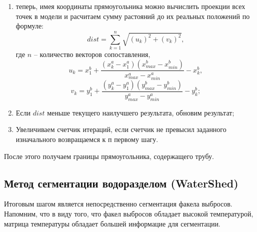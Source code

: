\documentclass[14pt, a4paper]{extreport}
\begin{document}
\begin{enumerate}[label={\arabic*)}]
\begin{subequations}
			\begin{equation*}
				y^{b}_{1} = y^{b}_{min} - \frac{(y^{a}_{min} - y^{a}_{1})(y^{b}_{max} - y^{b}_{min})}{y^{a}_{max} - y^{a}_{min}},
			\end{equation*}
			\vspace*{-1.1cm}
			\begin{equation*}
				y^{b}_{2} = y^{b}_{max} + \frac{(y^{a}_{2} - y^{a}_{max})(y^{b}_{max} - y^{b}_{min})}{y^{a}_{max} - y^{a}_{min}};
			\end{equation*}
			\label{x,y,1,2}
			\vspace*{-0.8cm}
		\end{subequations}
		\item теперь, имея координаты прямоугольника можно вычислить проекции всех точек в модели и расчитаем сумму растояний до их реальных положений по формуле:
		\begin{equation}
			dist = \sum\limits_{k=1}^n \sqrt{(u_k)^2 + (v_k)^2},
			\label{dist}
		\end{equation}
		где $n$ -- количество векторов сопоставления, 
		\begin{equation*}
			u_k = x^{b}_{1} + \frac{(x^{a}_{k} - x^{a}_{1})(x^{b}_{max} - x^{b}_{min})}{x^{a}_{max} - x^{a}_{min}} - x^{b}_{k},
			\label{dist1dop}
		\end{equation*}
		\vspace*{-0.8cm}
		\begin{equation*}
			v_k = y^{b}_{1} + \frac{(y^{a}_{k} - y^{a}_{1})(y^{b}_{max} - y^{b}_{min})}{y^{a}_{max} - y^{a}_{min}} - y^{b}_{k};
			\label{dist2dop}
		\end{equation*}
		\item Если $dist$ меньше текущего наилучшего результата, обновим результат;
		\item Увеличиваем счетчик итераций, если счетчик не превысил заданного изначального возвращаемся к п первому шагу.
	\end{enumerate}

	После этого получаем границы прямоугольника, содержащего трубу.

\subsection{Метод сегментации водоразделом (WaterShed)}
	
	Итоговым шагом является непосредственно сегментация факела выбросов. Напомним, что в виду того, что факел выбросов обладает высокой температурой, матрица температуры обладает большей информацие для сегментации.
	
\end{document}
